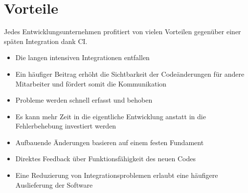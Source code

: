 \section{Vorteile}
Jedes Entwicklungsunternehmen profitiert von vielen Vorteilen gegenüber einer späten Integration dank CI.
\begin{itemize}
	\item Die langen intensiven Integrationen entfallen
	\item Ein häufiger Beitrag erhöht die Sichtbarkeit der Codeänderungen für andere Mitarbeiter und fördert somit die Kommunikation
	\item  Probleme werden schnell erfasst und behoben
	\item Es kann mehr Zeit in die eigentliche Entwicklung anstatt in die Fehlerbehebung investiert werden
	\item Aufbauende Änderungen basieren auf einem festen Fundament
	\item Direktes Feedback über Funktionsfähigkeit des neuen Codes
	\item Eine Reduzierung von Integrationsproblemen erlaubt eine häufigere Auslieferung der Software
\end{itemize}